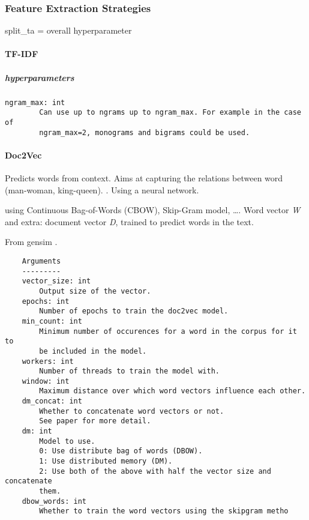\documentclass[
]{article}
\begin{document}
\hypertarget{feature-extraction-strategies}{%
\subsubsection{Feature Extraction
Strategies}\label{feature-extraction-strategies}}

split\_ta = overall hyperparameter

\hypertarget{tf-idf}{%
\paragraph{TF-IDF}\label{tf-idf}}

\hypertarget{hyperparameters-1}{%
\subparagraph{hyperparameters}\label{hyperparameters-1}}

\begin{verbatim}
ngram_max: int
        Can use up to ngrams up to ngram_max. For example in the case of
        ngram_max=2, monograms and bigrams could be used.
\end{verbatim}

\hypertarget{doc2vec}{%
\paragraph{Doc2Vec}\label{doc2vec}}

Predicts words from context. Aims at capturing the relations between
word (man-woman, king-queen). \autocite{Le2014}. Using a neural network.

using Continuous Bag-of-Words (CBOW), Skip-Gram model, \ldots. Word
vector \emph{W} and extra: document vector \emph{D}, trained to predict
words in the text.

From gensim \autocite{Rehurek2010}.

\begin{verbatim}
    Arguments
    ---------
    vector_size: int
        Output size of the vector.
    epochs: int
        Number of epochs to train the doc2vec model.
    min_count: int
        Minimum number of occurences for a word in the corpus for it to
        be included in the model.
    workers: int
        Number of threads to train the model with.
    window: int
        Maximum distance over which word vectors influence each other.
    dm_concat: int
        Whether to concatenate word vectors or not.
        See paper for more detail.
    dm: int
        Model to use.
        0: Use distribute bag of words (DBOW).
        1: Use distributed memory (DM).
        2: Use both of the above with half the vector size and concatenate
        them.
    dbow_words: int
        Whether to train the word vectors using the skipgram metho
        
        
\end{verbatim}
\end{document}
